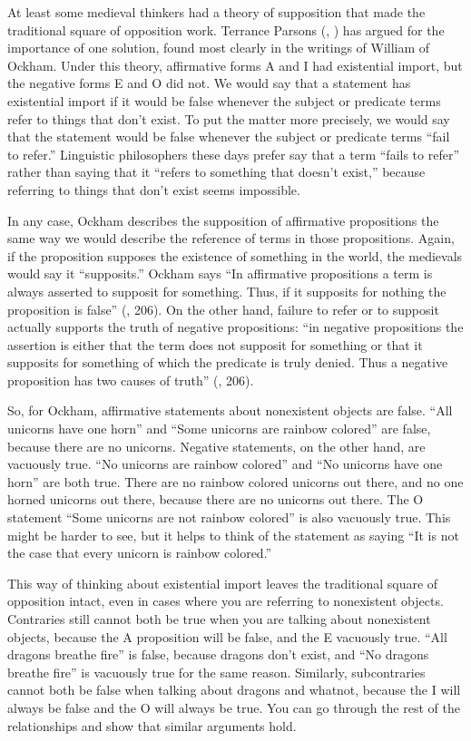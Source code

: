 At least some medieval thinkers had a theory of supposition that made the traditional square of opposition work. Terrance Parsons (\cite*{Parsons1997}, \cite*{Parsons2008})  has argued for the importance of one solution, found most clearly in the writings of William of Ockham. Under this theory, affirmative forms A and I had existential import, but the negative forms E and O did not. We would say that a statement has existential import if it would be false whenever the subject or predicate terms refer to things that don't exist. To put the matter more precisely, we would say that the statement would be false whenever the subject or predicate terms ``fail to refer.'' Linguistic philosophers these days prefer say that a term ``fails to refer'' rather than saying that it ``refers to something that doesn't exist,'' because referring to things that don't exist seems impossible.

In any case, Ockham describes the supposition of affirmative propositions the same way we would describe the reference of terms in those propositions. Again, if the proposition supposes the existence of something in the world, the medievals would say it ``supposits.''  Ockham says ``In affirmative propositions a term is always asserted to supposit for something. Thus, if it supposits for nothing the proposition is false'' (\cite*{Ockham1343}, 206). On the other hand, failure to refer or to supposit actually supports the truth of negative propositions: ``in negative propositions the assertion is either that the term does not supposit for something or that it supposits for something of which the predicate is truly denied. Thus a negative proposition has two causes of truth'' (\cite*{Ockham1343}, 206). 

So, for Ockham, affirmative statements about nonexistent objects are false. ``All unicorns have one horn'' and ``Some unicorns are rainbow colored'' are false, because there are no unicorns. Negative statements, on the other hand, are vacuously true. ``No unicorns are rainbow colored'' and ``No unicorns have one horn'' are both true. There are no rainbow colored unicorns out there, and no one horned unicorns out there, because there are no unicorns out there. The O statement ``Some unicorns are not rainbow colored'' is also vacuously true. This might be harder to see, but it helps to think of the statement as saying ``It is not the case that every unicorn is rainbow colored.'' 

This way of thinking about existential import leaves the traditional square of opposition intact, even in cases where you are referring to nonexistent objects. Contraries still cannot both be true when you are talking about nonexistent objects, because the A proposition will be false, and the E vacuously true. ``All dragons breathe fire'' is false, because dragons don't exist, and ``No dragons breathe fire'' is vacuously true for the same reason. Similarly, subcontraries cannot both be false when talking about dragons and whatnot, because the I will always be false and the O will always be true. You can go through the rest of the relationships and show that similar arguments hold. \label{proving_trad_square}
         
